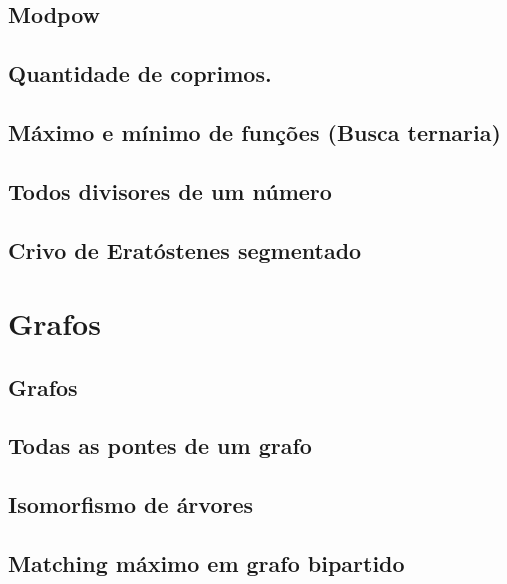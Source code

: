 \subsection{Modpow}
\raggedbottom
\hrulefill
\subsection{Quantidade de coprimos.}
\raggedbottom
\hrulefill
\subsection{Máximo e mínimo de funções (Busca ternaria)}
\raggedbottom
\hrulefill
\subsection{Todos divisores de um número}
\raggedbottom
\hrulefill
\subsection{Crivo de Eratóstenes segmentado}
\raggedbottom
\hrulefill
\clearpage
\section{Grafos}
\subsection{Grafos}
\raggedbottom
\hrulefill
\subsection{Todas as pontes de um grafo}
\raggedbottom
\hrulefill
\subsection{Isomorfismo de árvores}
\raggedbottom
\hrulefill
\subsection{Matching máximo em grafo bipartido}
\raggedbottom
\hrulefill
